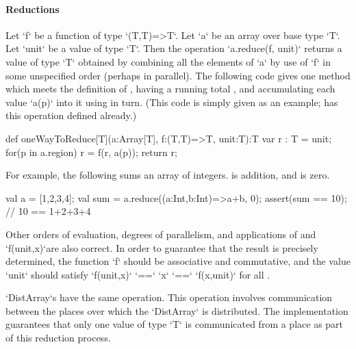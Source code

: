 \paragraph{Reductions}\label{ArrayReductions}

Let \xcd`f` be a function of type \xcd`(T,T)=>T`.  Let
\xcd`a` be an array over base type \xcd`T`.
Let \xcd`unit` be a value of type \xcd`T`.
Then the
operation \xcd`a.reduce(f, unit)` returns a value of type \xcd`T` obtained
by combining all the elements of \xcd`a` by use of  \xcd`f` in some unspecified order
(perhaps in parallel).   
The following code gives one method which 
meets the definition of ,
having a running total , and accumulating each value \xcd`a(p)` into it
using  in turn.  (This code is simply given as an example; 
has this operation defined already.)
\begin{xten}
def oneWayToReduce[T](a:Array[T], f:(T,T)=>T, unit:T):T {
  var r : T = unit;
  for(p in a.region) r = f(r, a(p));
  return r;
}
\end{xten}


For example,  the following sums an array of integers.   is addition,
and  is zero.  
\begin{xten}
val a = [1,2,3,4];
val sum = a.reduce((a:Int,b:Int)=>a+b, 0); 
assert(sum == 10); // 10 == 1+2+3+4
\end{xten}

Other orders of evaluation, degrees of parallelism, and applications of
 and \xcd`f(unit,x)`are also correct.
In order to guarantee that the result is precisely
determined, the  function \xcd`f` should be associative and
commutative, and the value \xcd`unit` should satisfy
\xcd`f(unit,x)` \xcd`==` \xcd`x` \xcd`==` \xcd`f(x,unit)`
for all .  




\xcd`DistArray`s have the same operation.
This operation involves communication between the places over which
the \xcd`DistArray` is distributed. The \Xten{} implementation guarantees that
only one value of type \xcd`T` is communicated from a place as part of
this reduction process.

